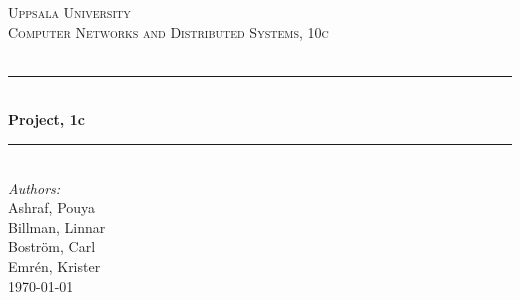 \documentclass[12pt]{article}
\begin{document}

\begin{titlepage}

\newcommand{\HRule}{\rule{\linewidth}{0.5mm}} %

\begin{center}
\textsc{\LARGE Uppsala University}\\[1.5cm] %
\textsc{\Large Computer Networks and Distributed Systems, 10c}\\[0.5cm] %
\textsc{\large }\\[0.5cm] %

\HRule \\[0.4cm]
{ \huge \bfseries Project, 1c}\\[0.4cm] %
\HRule \\[1.5cm]
 

\large\emph{Authors:}\\Ashraf, Pouya\\
					Billman, Linnar\\
					Boström, Carl\\
					Emrén, Krister\\[1.0cm]%




{\large \today}\\[2cm] %

\end{center}
\end{titlepage}
\pagebreak
\tableofcontents
\pagebreak
\end{document}
